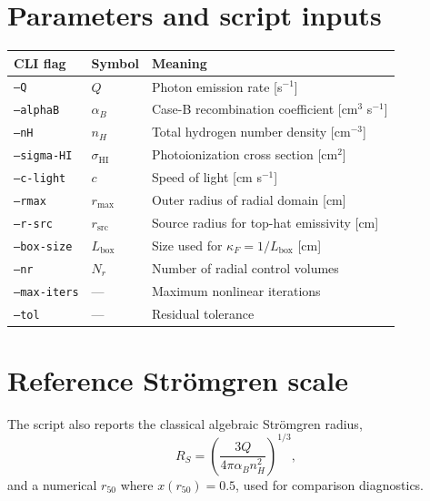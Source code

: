 \documentclass[11pt]{article}
\begin{document}
\section{Parameters and script inputs}
\begin{center}
\begin{tabular}{lll}
\toprule
CLI flag & Symbol & Meaning \\
\midrule
\texttt{--Q} & $Q$ & Photon emission rate [s$^{-1}$] \\
\texttt{--alphaB} & $\alpha_B$ & Case-B recombination coefficient [cm$^3$ s$^{-1}$] \\
\texttt{--nH} & $n_H$ & Total hydrogen number density [cm$^{-3}$] \\
\texttt{--sigma-HI} & $\sigma_{\mathrm{HI}}$ & Photoionization cross section [cm$^2$] \\
\texttt{--c-light} & $c$ & Speed of light [cm s$^{-1}$] \\
\texttt{--rmax} & $r_{\max}$ & Outer radius of radial domain [cm] \\
\texttt{--r-src} & $r_{\mathrm{src}}$ & Source radius for top-hat emissivity [cm] \\
\texttt{--box-size} & $L_{\mathrm{box}}$ & Size used for $\kappa_F=1/L_{\mathrm{box}}$ [cm] \\
\texttt{--nr} & $N_r$ & Number of radial control volumes \\
\texttt{--max-iters} & --- & Maximum nonlinear iterations \\
\texttt{--tol} & --- & Residual tolerance \\
\bottomrule
\end{tabular}
\end{center}

\section{Reference Str\"omgren scale}
The script also reports the classical algebraic Str\"omgren radius,
\begin{equation}
R_S=\left(\frac{3Q}{4\pi\alpha_B n_H^2}\right)^{1/3},
\end{equation}
and a numerical $r_{50}$ where $x(r_{50})=0.5$, used for comparison diagnostics.
\end{document}

